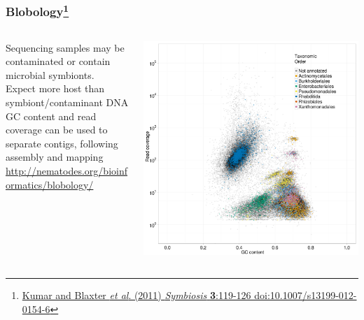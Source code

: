 \begin{frame}
  \frametitle{Blobology\footnote{\tiny{\href{http://dx.doi.org/10.1007/s13199-012-0154-6}{Kumar and Blaxter \textit{et al}. (2011) \textit{Symbiosis} \textbf{3}:119-126 doi:10.1007/s13199-012-0154-6}}}}
  \begin{columns}[T]
    \begin{column}{5cm}
      Sequencing samples may be contaminated or contain microbial symbionts.\\
      Expect more host than symbiont/contaminant DNA\\
      GC content and read coverage can be used to separate contigs, following assembly and mapping\\
      \href{http://nematodes.org/bioinformatics/blobology/}{http://nematodes.org/bioinformatics/blobology/}
    \end{column}
    \begin{column}{5cm}
      \includegraphics[width=1\textwidth]{images/blobology}
    \end{column}
  \end{columns}
\end{frame}

